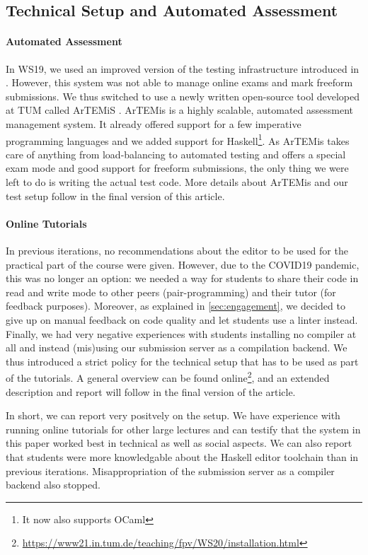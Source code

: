 \subsection{Technical Setup and Automated Assessment}\label{sec:tech_setup_test}

\paragraph{Automated Assessment}
In WS19, we used an improved version of
the testing infrastructure introduced in \cite{next_1100}.
However, this system was not able to manage online exams and mark freeform submissions.
We thus switched to use a newly written open-source
tool developed at TUM called ArTEMiS \cite{artemis}.
ArTEMis is a highly scalable, automated assessment management system.
It already offered support for a few imperative programming languages
and we added support for Haskell\footnote{It now also supports OCaml}.
As ArTEMis takes care of anything from load-balancing to
automated testing and
offers a special exam mode and good support for freeform submissions,
the only thing we were left to do is writing the actual test code.
More details about ArTEMis and our test setup follow
in the final version of this article.

\paragraph{Online Tutorials}
In previous iterations,
no recommendations about the editor to be used for the practical part of the course
were given.
However, due to the COVID19 pandemic,
this was no longer an option:
we needed a way for students to share their code in read and write mode
to other peers (pair-programming) and their tutor (for feedback purposes).
Moreover, as explained in \cref{sec:engagement},
we decided to give up on manual feedback on code quality
and let students use a linter instead.
Finally, we had very negative experiences with students
installing no compiler at all
and instead (mis)using our submission server as a compilation backend.
We thus introduced a strict policy
for the technical setup that has to be used as part of
the tutorials.
A general overview can be found online\footnote{\url{https://www21.in.tum.de/teaching/fpv/WS20/installation.html}},
and an extended description and report will follow in the final version of the article.

In short, we can report very positvely on the setup.
We have experience with running online tutorials for other large lectures and can testify that
the system in this paper worked best in technical as well as social aspects.
We can also report that students were more knowledgable
about the Haskell editor toolchain than in previous iterations.
Misappropriation of the submission server as a compiler backend also stopped.

